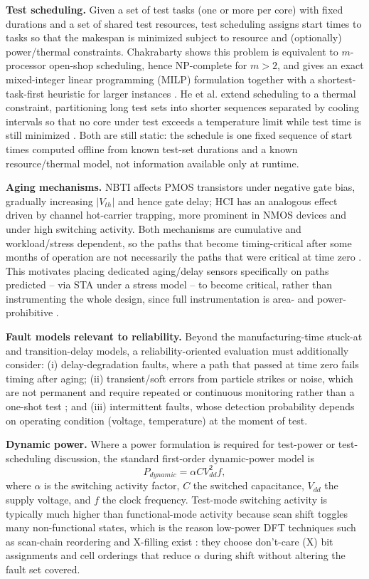 \documentclass[journal]{IEEEtran}
\begin{document}
\textbf{Test scheduling.} Given a set of test tasks (one or more per core) with fixed durations and a set of shared test resources, test scheduling assigns start times to tasks so that the makespan is minimized subject to resource and (optionally) power/thermal constraints. Chakrabarty shows this problem is equivalent to $m$-processor open-shop scheduling, hence NP-complete for $m>2$, and gives an exact mixed-integer linear programming (MILP) formulation together with a shortest-task-first heuristic for larger instances \cite{r2}. He et al. extend scheduling to a thermal constraint, partitioning long test sets into shorter sequences separated by cooling intervals so that no core under test exceeds a temperature limit while test time is still minimized \cite{r3}. Both are still static: the schedule is one fixed sequence of start times computed offline from known test-set durations and a known resource/thermal model, not information available only at runtime.

\textbf{Aging mechanisms.} NBTI affects PMOS transistors under negative gate bias, gradually increasing $|V_{th}|$ and hence gate delay; HCI has an analogous effect driven by channel hot-carrier trapping, more prominent in NMOS devices and under high switching activity. Both mechanisms are cumulative and workload/stress dependent, so the paths that become timing-critical after some months of operation are not necessarily the paths that were critical at time zero \cite{r4,r5}. This motivates placing dedicated aging/delay sensors specifically on paths predicted -- via STA under a stress model -- to become critical, rather than instrumenting the whole design, since full instrumentation is area- and power-prohibitive \cite{r4}.

\textbf{Fault models relevant to reliability.} Beyond the manufacturing-time stuck-at and transition-delay models, a reliability-oriented evaluation must additionally consider: (i) delay-degradation faults, where a path that passed at time zero fails timing after aging; (ii) transient/soft errors from particle strikes or noise, which are not permanent and require repeated or continuous monitoring rather than a one-shot test \cite{r8}; and (iii) intermittent faults, whose detection probability depends on operating condition (voltage, temperature) at the moment of test.

\textbf{Dynamic power.} Where a power formulation is required for test-power or test-scheduling discussion, the standard first-order dynamic-power model is
\begin{equation}
P_{dynamic}=\alpha C V_{dd}^{2} f,
\end{equation}
where $\alpha$ is the switching activity factor, $C$ the switched capacitance, $V_{dd}$ the supply voltage, and $f$ the clock frequency. Test-mode switching activity is typically much higher than functional-mode activity because scan shift toggles many non-functional states, which is the reason low-power DFT techniques such as scan-chain reordering and X-filling exist \cite{r11}: they choose don't-care (X) bit assignments and cell orderings that reduce $\alpha$ during shift without altering the fault set covered.
\end{document}
